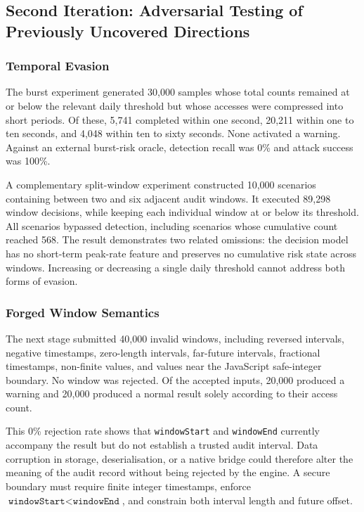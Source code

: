 \subsection{Second Iteration: Adversarial Testing of Previously Uncovered Directions}

\subsubsection{Temporal Evasion}

The burst experiment generated 30,000 samples whose total counts remained at or below the relevant daily threshold but whose accesses were compressed into short periods. Of these, 5,741 completed within one second, 20,211 within one to ten seconds, and 4,048 within ten to sixty seconds. None activated a warning. Against an external burst-risk oracle, detection recall was 0\% and attack success was 100\%.

A complementary split-window experiment constructed 10,000 scenarios containing between two and six adjacent audit windows. It executed 89,298 window decisions, while keeping each individual window at or below its threshold. All scenarios bypassed detection, including scenarios whose cumulative count reached 568. The result demonstrates two related omissions: the decision model has no short-term peak-rate feature and preserves no cumulative risk state across windows. Increasing or decreasing a single daily threshold cannot address both forms of evasion.

\subsubsection{Forged Window Semantics}

The next stage submitted 40,000 invalid windows, including reversed intervals, negative timestamps, zero-length intervals, far-future intervals, fractional timestamps, non-finite values, and values near the JavaScript safe-integer boundary. No window was rejected. Of the accepted inputs, 20,000 produced a warning and 20,000 produced a normal result solely according to their access count.

This 0\% rejection rate shows that \texttt{windowStart} and \texttt{windowEnd} currently accompany the result but do not establish a trusted audit interval. Data corruption in storage, deserialisation, or a native bridge could therefore alter the meaning of the audit record without being rejected by the engine. A secure boundary must require finite integer timestamps, enforce \(\texttt{windowStart}<\texttt{windowEnd}\), and constrain both interval length and future offset.

